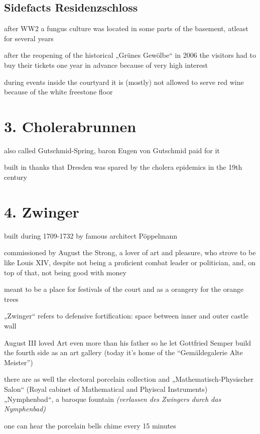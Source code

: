 \documentclass[a4paper,12pt]{report}
\begin{document}
\subsection{Sidefacts Residenzschloss}
\begin{itemize*}
\item after WW2 a fungus culture was located in some parts of the basement, atleast for several years
\item after the reopening of the historical „Grünes Gewölbe“ in 2006 the visitors had to buy their tickets one year in advance because of very high interest
\item during events inside the courtyard it is (mostly) not allowed to serve red wine because of the white freestone floor
\end{itemize*}


\section{3. Cholerabrunnen}
\begin{itemize*}
\item also called Gutschmid-Spring, baron Eugen von Gutschmid paid for it
\item built in thanks that Dresden was spared by the cholera epidemics in the 19th century
\end{itemize*}

\section{4. Zwinger}
\begin{itemize*}
\item built during 1709-1732 by famous architect Pöppelmann
\item commissioned by August the Strong, a lover of art and pleasure, who strove to be like Louis XIV, despite not being a proficient combat leader or politician, and, on top of that, not being good with money
\item meant to be a place for festivals of the court and as a orangery for the orange trees
\item „Zwinger“ refers to defensive fortification: space between inner and outer castle wall
\item August III loved Art even more than his father so he let Gottfried Semper build the fourth side as an art gallery (today it’s home of the “Gemäldegalerie Alte Meister”)
\item there are as well the electoral porcelain collection and „Mathematisch-Physischer Salon“ (Royal cabinet of Mathematical and Phyiscal Instruments)
„Nymphenbad“, a baroque fountain \textit{(verlassen des Zwingers durch das Nymphenbad)}
\item one can hear the porcelain bells chime every 15 minutes
\end{itemize*}
\end{document}
